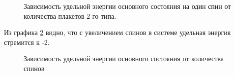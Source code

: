 \documentclass[utf8, babel, sor, jor, amsmath, amssymb, reprint]{elsarticle} %
\begin{document}
\begin{figure}[H]
	\centering
	\caption{Зависимость удельной энергии основного состояния на один спин от количества плакетов 2-го типа.}
	\label{fig:Egs_N_F}
\end{figure}

Из графика \ref{fig:Egs____N_F} видно, что с увеличением спинов в системе удельная энергия стремится к -2.

\begin{figure}[H]
	\centering
	\caption{Зависимость удельной энергии основного состояния от количества спинов}
	\label{fig:Egs____N_F}
\end{figure}
\end{document}
